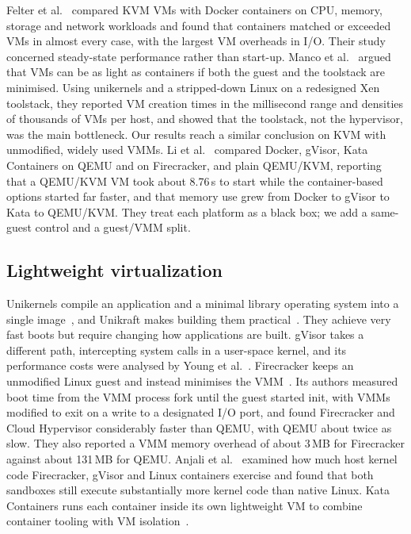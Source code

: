 \documentclass[pdflatex,sn-mathphys-num]{sn-jnl}%
\begin{document}
Felter et al.~\cite{felter2015} compared KVM VMs with Docker containers on CPU, memory, storage and network workloads and found that containers matched or exceeded VMs in almost every case, with the largest VM overheads in I/O. Their study concerned steady-state performance rather than start-up. Manco et al.~\cite{manco2017lightvm} argued that VMs can be as light as containers if both the guest and the toolstack are minimised. Using unikernels and a stripped-down Linux on a redesigned Xen toolstack, they reported VM creation times in the millisecond range and densities of thousands of VMs per host, and showed that the toolstack, not the hypervisor, was the main bottleneck. Our results reach a similar conclusion on KVM with unmodified, widely used VMMs. Li et al.~\cite{li2021lightweight} compared Docker, gVisor, Kata Containers on QEMU and on Firecracker, and plain QEMU/KVM, reporting that a QEMU/KVM VM took about 8.76\,s to start while the container-based options started far faster, and that memory use grew from Docker to gVisor to Kata to QEMU/KVM. They treat each platform as a black box; we add a same-guest control and a guest/VMM split.

\subsection{Lightweight virtualization}

Unikernels compile an application and a minimal library operating system into a single image~\cite{madhavapeddy2013unikernels}, and Unikraft makes building them practical~\cite{kuenzer2021unikraft}. They achieve very fast boots but require changing how applications are built. gVisor takes a different path, intercepting system calls in a user-space kernel, and its performance costs were analysed by Young et al.~\cite{young2019gvisor}. Firecracker keeps an unmodified Linux guest and instead minimises the VMM~\cite{agache2020firecracker}. Its authors measured boot time from the VMM process fork until the guest started init, with VMMs modified to exit on a write to a designated I/O port, and found Firecracker and Cloud Hypervisor considerably faster than QEMU, with QEMU about twice as slow. They also reported a VMM memory overhead of about 3\,MB for Firecracker against about 131\,MB for QEMU. Anjali et al.~\cite{anjali2020blending} examined how much host kernel code Firecracker, gVisor and Linux containers exercise and found that both sandboxes still execute substantially more kernel code than native Linux. Kata Containers runs each container inside its own lightweight VM to combine container tooling with VM isolation~\cite{katacontainers}.
\end{document}
